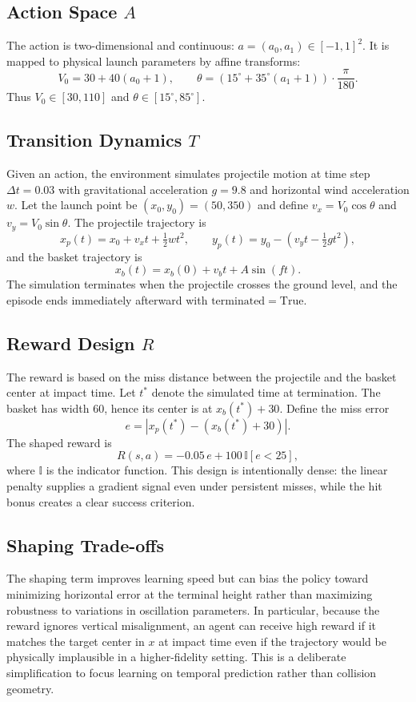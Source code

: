 \documentclass[a4paper,11pt,notitlepage]{report}
\begin{document}
\subsection{Action Space \texorpdfstring{$A$}{A}}
The action is two-dimensional and continuous: $a=(a_0,a_1)\in[-1,1]^2$. It is mapped to physical launch parameters by affine transforms:
\[
V_0 = 30 + 40(a_0+1),\qquad \theta = \left(15^\circ + 35^\circ(a_1+1)\right)\cdot \frac{\pi}{180}.
\]
Thus $V_0\in[30,110]$ and $\theta\in[15^\circ,85^\circ]$.

\subsection{Transition Dynamics \texorpdfstring{$T$}{T}}
Given an action, the environment simulates projectile motion at time step $\Delta t=0.03$ with gravitational acceleration $g=9.8$ and horizontal wind acceleration $w$. Let the launch point be $(x_0,y_0)=(50,350)$ and define $v_x=V_0\cos\theta$ and $v_y=V_0\sin\theta$. The projectile trajectory is
\[
x_p(t)=x_0 + v_x t + \tfrac{1}{2} w t^2,\qquad
y_p(t)=y_0 - \left(v_y t - \tfrac{1}{2} g t^2\right),
\]
and the basket trajectory is
\[
x_b(t)=x_b(0)+v_b t + A\sin(ft).
\]
The simulation terminates when the projectile crosses the ground level, and the episode ends immediately afterward with $\mathrm{terminated}=\mathrm{True}$.

\subsection{Reward Design \texorpdfstring{$R$}{R}}
The reward is based on the miss distance between the projectile and the basket center at impact time. Let $t^\ast$ denote the simulated time at termination. The basket has width $60$, hence its center is at $x_b(t^\ast)+30$. Define the miss error
\[
e=\left|x_p(t^\ast)-\left(x_b(t^\ast)+30\right)\right|.
\]
The shaped reward is
\[
R(s,a)= -0.05\,e + 100\,\mathbb{I}[e<25],
\]
where $\mathbb{I}$ is the indicator function. This design is intentionally dense: the linear penalty supplies a gradient signal even under persistent misses, while the hit bonus creates a clear success criterion.

\subsection{Shaping Trade-offs}
The shaping term improves learning speed but can bias the policy toward minimizing horizontal error at the terminal height rather than maximizing robustness to variations in oscillation parameters. In particular, because the reward ignores vertical misalignment, an agent can receive high reward if it matches the target center in $x$ at impact time even if the trajectory would be physically implausible in a higher-fidelity setting. This is a deliberate simplification to focus learning on temporal prediction rather than collision geometry.
\end{document}
